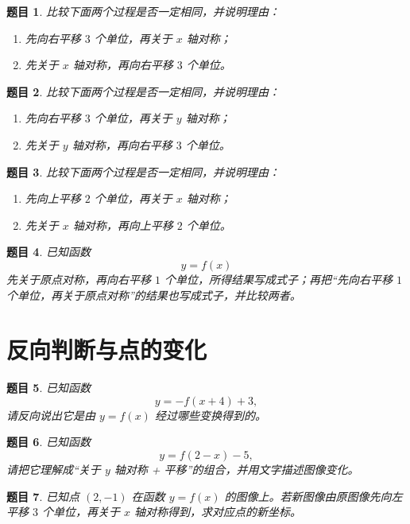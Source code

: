 \documentclass[11pt,a4paper,fontset=fandol]{ctexart}
\theoremstyle{formalexample}
\newtheorem{exercise}{题目}[section]
\begin{document}
\begin{exercise}
比较下面两个过程是否一定相同，并说明理由：
\begin{enumerate}
  \item 先向右平移 $3$ 个单位，再关于 \(x\) 轴对称；
  \item 先关于 \(x\) 轴对称，再向右平移 $3$ 个单位。
\end{enumerate}
\end{exercise}

\begin{exercise}
比较下面两个过程是否一定相同，并说明理由：
\begin{enumerate}
  \item 先向右平移 $3$ 个单位，再关于 \(y\) 轴对称；
  \item 先关于 \(y\) 轴对称，再向右平移 $3$ 个单位。
\end{enumerate}
\end{exercise}

\begin{exercise}
比较下面两个过程是否一定相同，并说明理由：
\begin{enumerate}
  \item 先向上平移 $2$ 个单位，再关于 \(x\) 轴对称；
  \item 先关于 \(x\) 轴对称，再向上平移 $2$ 个单位。
\end{enumerate}
\end{exercise}

\begin{exercise}
已知函数
\[
y=f(x)
\]
先关于原点对称，再向右平移 $1$ 个单位，所得结果写成式子；再把“先向右平移 $1$ 个单位，再关于原点对称”的结果也写成式子，并比较两者。
\end{exercise}

\section{反向判断与点的变化}

\begin{exercise}
已知函数
\[
y=-f(x+4)+3,
\]
请反向说出它是由 \(y=f(x)\) 经过哪些变换得到的。
\end{exercise}

\begin{exercise}
已知函数
\[
y=f(2-x)-5,
\]
请把它理解成“关于 \(y\) 轴对称 + 平移”的组合，并用文字描述图像变化。
\end{exercise}

\begin{exercise}
已知点 \((2,-1)\) 在函数 \(y=f(x)\) 的图像上。若新图像由原图像先向左平移 $3$ 个单位，再关于 \(x\) 轴对称得到，求对应点的新坐标。
\end{exercise}
\end{document}
